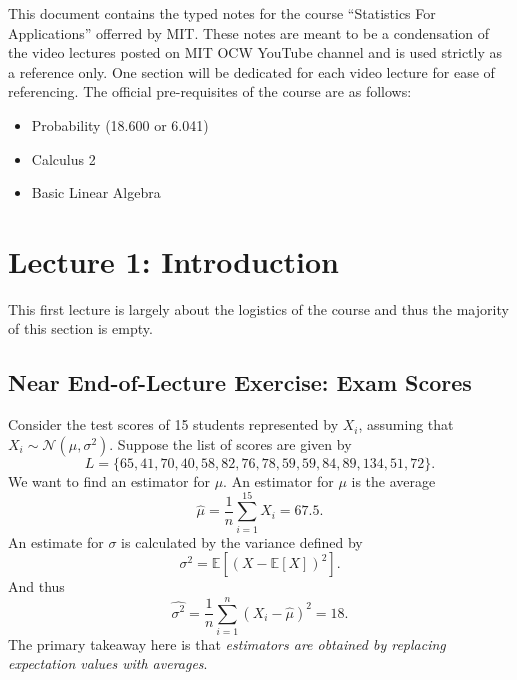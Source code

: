 \documentclass{article}
\begin{document}
	\abstract
	This document contains the typed notes for the course ``Statistics For Applications'' offerred by MIT. These notes are meant to be a condensation of the video lectures posted on MIT OCW YouTube channel and is used strictly as a reference only. One section will be dedicated for each video lecture for ease of referencing. The official pre-requisites of the course are as follows:
	\begin{itemize}
		\item Probability (18.600 or 6.041)
		\item Calculus 2
		\item Basic Linear Algebra
	\end{itemize}

	\newpage
	\tableofcontents

	\newpage
	\section{Lecture 1: Introduction}
	This first lecture is largely about the logistics of the course and thus the majority of this section is empty.	
	
	\subsection{Near End-of-Lecture Exercise: Exam Scores}
	Consider the test scores of 15 students represented by $X_i$, assuming that $X_i \sim \mathcal{N}(\mu, \sigma^2)$. Suppose the list of scores are given by
	\begin{equation}
		L = \{ 65, 41, 70, 40, 58, 82, 76, 78, 59, 59, 84, 89, 134, 51, 72\}.
	\end{equation}
	We want to find an estimator for $\mu$. An estimator for $\mu$ is the average
	\begin{equation}
		\hat{\mu} = \frac{1}{n} \sum_{i=1}^{15} X_i = 67.5.
	\end{equation}
	An estimate for $\sigma$ is calculated by the variance defined by
	\begin{equation}
		\sigma^2 = \mathbb{E} \left[ (X - \mathbb{E}[X])^2 \right].
	\end{equation}
	And thus
	\begin{equation}
		\hat{\sigma^2} = \frac{1}{n} \sum_{i=1}^n \left( X_i - \hat{\mu} \right)^2 = 18.
	\end{equation}
	The primary takeaway here is that \emph{estimators are obtained by replacing expectation values with averages}.
\end{document}
